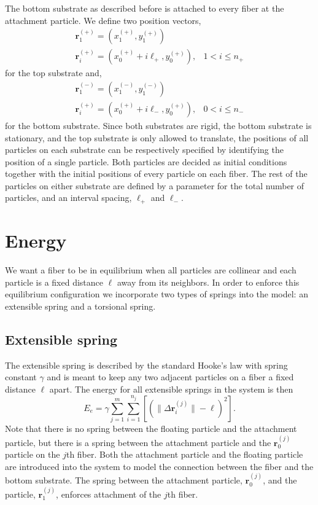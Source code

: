 	The bottom substrate as described before is attached to every fiber at the attachment particle. We define two position vectors,
\begin{eqnarray}
	\textbf{r}_1^{(+)} = (x_1^{(+)},y_1^{(+)}) & \\
	\textbf{r}_i^{(+)} = (x_0^{(+)} + i\ell_+,y_0^{(+)}), & 1 < i \leq n_+
\end{eqnarray}
for the top substrate and,
\begin{eqnarray}
	\textbf{r}_1^{(-)} = (x_1^{(-)},y_1^{(-)}) & \\
	\textbf{r}_i^{(+)} = (x_0^{(+)} + i\ell_-,y_0^{(+)}), & 0 < i \leq n_-
\end{eqnarray} 
for the bottom substrate. Since both substrates are rigid, the bottom substrate is stationary, and the top substrate is only allowed to translate, the positions of all particles on each substrate can be respectively specified by identifying the position of a single particle. Both particles are decided as initial conditions together with the initial positions of every particle on each fiber. The rest of the particles on either substrate are defined by a parameter for the total number of particles, and an interval spacing, $\ell_+$ and $\ell_-$.

\section{Energy}

	We want a fiber to be in equilibrium when all particles are collinear and each particle is a fixed distance $\ell$ away from its neighbors. In order to enforce this equilibrium configuration we incorporate two types of springs into the model: an extensible spring and a torsional spring.

\subsection{Extensible spring}

	The extensible spring is described by the standard Hooke's law with spring constant $\gamma$ and is meant to keep any two adjacent particles on a fiber a fixed distance $\ell$ apart. The energy for all extensible springs in the system is then
\begin{equation}
	E_e = \gamma \sum_{j=1}^m \sum_{i=1}^{n_j} \left[ \left( \|\Delta \textbf{r}_i^{(j)} \| - \ell \right)^2 \right].
\end{equation}
Note that there is no spring between the floating particle and the attachment particle, but there is a spring between the attachment particle and the $\textbf{r}_0^{(j)}$ particle on the $j$th fiber. Both the attachment particle and the floating particle are introduced into the system to model the connection between the fiber and the bottom substrate. The spring between the attachment particle, $\textbf{r}_0^{(j)}$, and the particle, $\textbf{r}_1^{(j)}$, enforces attachment of the $j$th fiber.

